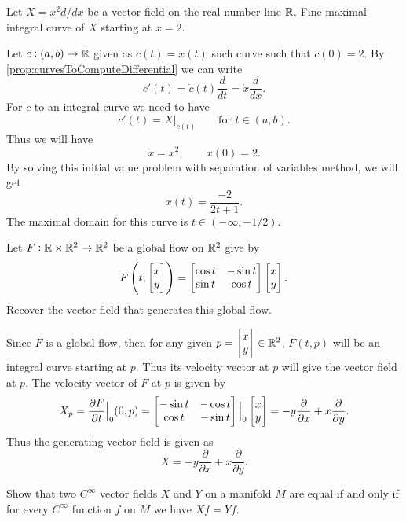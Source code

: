 \begin{problem}
	Let $ X = x^2 d/dx $ be a vector field on the real number line $ \mathbb{R} $. Fine maximal integral curve of $ X $ starting at $ x =2 $.
\end{problem}
\begin{solution}
	Let $ c:(a,b) \to \mathbb{R} $ given as $ c(t) = x(t) $ such curve such that $ c(0) = 2 $. By \autoref{prop:curvesToComputeDifferential} we can write
	\[ c'(t) = \dot{c}(t) \frac{d}{dt} = \dot{x} \frac{d}{dx}. \]
	For $ c $ to an integral curve we need to have
	\[ c'(t) = X|_{c(t)} \qquad \text{for } t\in (a,b).  \]
	Thus we will have
	\[ \dot{x} = x^2, \qquad x(0) = 2. \]
	By solving this initial value problem with separation of variables method, we will get
	\[ x(t) = \frac{-2}{2t+1}. \]
	The maximal domain for this curve is $ t \in (-\infty, -1/2) $.
\end{solution}


\begin{problem}
	Let $ F: \mathbb{R}\times \mathbb{R}^2 \to \mathbb{R}^2 $ be a global flow on $ \mathbb{R}^2 $ give by
	\[ F\left( t, \begin{bmatrix} x \\ y \end{bmatrix} \right) = \begin{bmatrix} \cos t & -\sin t \\ \sin t & \cos t \end{bmatrix} \begin{bmatrix} x \\ y \end{bmatrix}. \]
	Recover the vector field that generates this global flow.
\end{problem}
\begin{solution}
	Since $ F $ is a global flow, then for any given $ p = \begin{bmatrix} x \\ y \end{bmatrix} \in \mathbb{R}^2 $, $ F(t,p) $ will be an integral curve starting at $ p $. Thus its velocity vector at $ p $ will give the vector field at $ p $. The velocity vector of $ F $ at $ p $ is given by
	\[ X_p = \frac{\partial F }{\partial t}\big|_{0}(0,p) = \begin{bmatrix} -\sin t & -\cos t \\ \cos t & -\sin t \end{bmatrix}\big|_{0} \begin{bmatrix} x \\ y \end{bmatrix} = -y\frac{\partial }{\partial x} + x \frac{\partial }{\partial y}. \]
	Thus the generating vector field is given as
	\[ X = -y \frac{\partial }{\partial x } + x \frac{\partial }{\partial y}. \]
\end{solution}

\begin{problem}
	Show that two $ C^\infty $ vector fields $ X $ and $ Y $ on a manifold $ M $ are equal if and only if for every $ C^\infty $ function $ f $ on $ M $ we have $ Xf = Yf $.
\end{problem}

